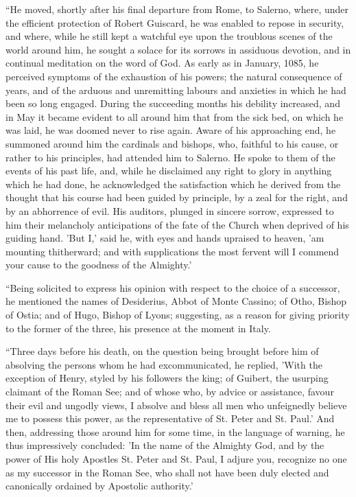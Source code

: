 ``He
moved, shortly after his final departure from Rome, to Salerno, where,
under the efficient protection of Robert Guiscard, he was enabled to
repose in security, and where, while he still kept a watchful eye upon
the troublous scenes of the world around him, he sought a solace for
its sorrows in assiduous devotion, and in continual meditation
on the word of God. As early as in January, 1085, he perceived
symptoms of the exhaustion of his powers; the natural consequence of
years, and of the arduous and unremitting labours and anxieties in
which he had been so long engaged. During the succeeding months his
debility increased, and in May it became evident to all around him
that from the sick bed, on which he was laid, he was doomed never to
rise again. Aware of his approaching end, he summoned around him the
cardinals and bishops, who, faithful to his cause, or rather to his
principles, had attended him to Salerno. He spoke to them of the
events of his past life, and, while he disclaimed any right to glory
in anything which he had done, he acknowledged the satisfaction which
he derived from the thought that his course had been guided by
principle, by a zeal for the right, and by an abhorrence of evil. His
auditors, plunged in sincere sorrow, expressed to him their melancholy
anticipations of the fate of the Church when deprived of his guiding
hand. 'But I,' said he, with eyes and hands upraised to heaven, 'am
mounting thitherward; and with supplications the most fervent will I
commend your cause to the goodness of the Almighty.'

``Being
solicited to express his opinion with respect to the choice of a
successor, he mentioned the names of Desiderius, Abbot of Monte
Cassino; of Otho, Bishop of Ostia; and of Hugo, Bishop of Lyons;
suggesting, as a reason for giving priority to the former of the
three, his presence at the moment in Italy.

``Three
days before his death, on the question being brought before him of
absolving the persons whom he had excommunicated, he replied, 'With
the exception of Henry, styled by his followers the king; of Guibert,
the usurping claimant of the Roman See; and of whose who, by advice or
assistance, favour their evil and ungodly views, I absolve and bless
all men who unfeignedly believe me to possess this power, as the
representative of St. Peter and St. Paul.' And then, addressing those
around him for some time, in the language of warning, he thus
impressively concluded: 'In the name of the Almighty God, and by the
power of His holy Apostles St. Peter and St. Paul, I adjure you,
recognize no one as my successor in the Roman See, who shall not have
been duly elected and canonically ordained by Apostolic authority.'

